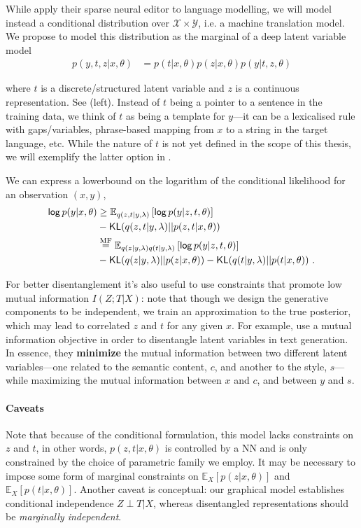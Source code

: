 While \citet{he2020LearningSparsePrototypes} apply their sparse neural editor
to language modelling, we will model instead a conditional
distribution over $\mathcal{X} \times \mathcal{Y}$, i.e. a
machine translation model. We propose to model this distribution
as the marginal of a deep latent variable model
\begin{align}
    p(y, t, z|x, \theta) &=
    p(t | x, \theta)p(z |x, \theta)p(y |t, z, \theta)
\end{align}

\noindent where $t$ is a discrete/structured latent variable and $z$ is a
continuous representation. See  (left).
Instead of $t$ being a pointer to a sentence in the training data, we
think of $t$ as being a template for $y$---it can be a lexicalised
rule with gaps/variables, phrase-based mapping from $x$ to a string
in the target language, etc. While the nature of $t$ is not yet
defined in the scope of this thesis, we will exemplify the latter
option in .

We can express a lowerbound on the logarithm of the conditional likelihood for an observation $(x,y)$,
\begin{align}
    \operatorname*{\mathsf{log}} p(y|x, \theta) &\ge \mathbb E_{q(z,t|y,\lambda)}\left[ \operatorname*{\mathsf{log}} p(y|z,t, \theta) \right] \nonumber \\
    &- \operatorname{\mathsf{KL}}(q(z, t|y,\lambda) || p(z, t|x, \theta)) \\
    &\overset{\text{MF}}{=} \mathbb E_{q(z|y,\lambda)q(t|y,\lambda)}\left[ \operatorname*{\mathsf{log}} p(y|z,t, \theta) \right] \nonumber \\
    &- \operatorname{\mathsf{KL}}(q(z|y,\lambda) || p(z|x,\theta)) - \operatorname{\mathsf{KL}}(q(t|y,\lambda) || p(t|x, \theta)) ~.
\end{align}

For better disentanglement it's also useful to use constraints that
promote low mutual information $I(Z;T|X)$: note that though we design
the generative components to be independent, we train an
approximation to the true posterior, which may lead to correlated $z$
and $t$ for any given $x$. For example,
\citet{chengImprovingDisentangledText2020} use a mutual information
objective in order to disentangle latent variables in text
generation. In essence, they {\bf minimize} the mutual information
between two different latent variables---one related to the semantic
content, $c$, and another to the style, $s$---while maximizing the
mutual information between $x$ and $c$, and between $y$ and $s$.

\paragraph*{Caveats} Note that because of the conditional formulation,
this model lacks constraints on $z$ and $t$, in other words,
$p(z,t|x,\theta)$ is controlled by a NN and is only constrained by
the choice of parametric family we employ. It may be necessary to
impose some form of marginal constraints on $\mathbb
E_X[p(z|x,\theta)]$ and $\mathbb E_X[p(t|x,\theta)]$. Another caveat
is conceptual: our graphical model establishes conditional
independence $Z \perp T | X$, whereas disentangled representations
should be \emph{marginally independent}.

